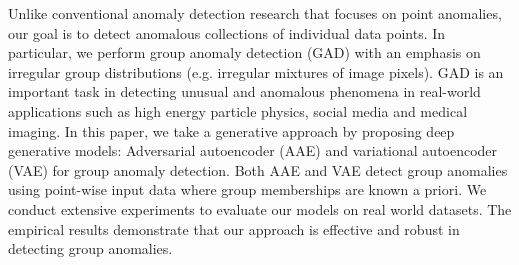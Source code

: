 

Unlike conventional anomaly detection research that focuses on point anomalies, our goal is to detect anomalous collections of individual data points. In particular, we perform group anomaly detection (GAD) with an emphasis on irregular group distributions (e.g. irregular mixtures of image pixels). GAD is an important task in detecting unusual and anomalous phenomena in  real-world applications such as high energy particle physics, social media and medical imaging. In this paper, we take a generative approach by proposing deep generative models: Adversarial autoencoder (AAE) and variational autoencoder (VAE) for group anomaly detection. Both AAE and VAE detect group anomalies using point-wise input data where group memberships are known a priori. We conduct extensive experiments to evaluate our models on real world datasets. The empirical results demonstrate that our approach is effective and robust in detecting group anomalies.



